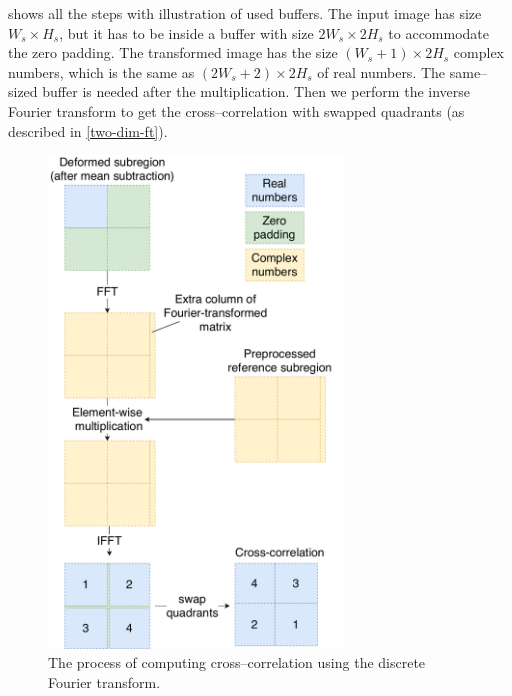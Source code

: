  shows all the steps with illustration of used buffers. The input image has size $W_s \times H_s$, but it has to be inside a buffer with size $2W_s \times 2H_s$ to accommodate the zero padding. The transformed image has the size $(W_s+1) \times 2H_s$ complex numbers, which is the same as  $(2W_s+2) \times 2H_s$ of real numbers. The same--sized buffer is needed after the multiplication. Then we perform the inverse Fourier transform to get the cross--correlation with swapped quadrants (as described in \cref{two-dim-ft}).

\begin{figure}
	\centering
	\includegraphics[width=0.7\textwidth]{img/fft-impl}
	\caption{The process of computing cross--correlation using the discrete Fourier transform.}
	\label{fft-impl}
\end{figure}

